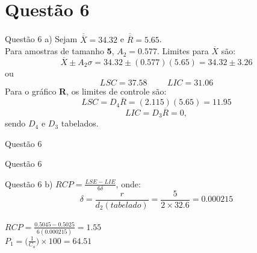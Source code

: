 \documentclass[fleqn]{beamer}\usepackage[]{graphicx}\usepackage[]{color}
\begin{document}
	\section{Questão 6}
		\begin{frame}{Questão 6}
			a)  Sejam $\overline{\overline X} = 34.32$ e $\overline{\overline R} = 5.65$.\\
			Para amostras de tamanho \textbf{5}, $A_{2} = 0.577$.
			Limites para $\overline{X}$ são:
			$$\overline{X} \pm A_{2}\sigma = 34.32 \pm (0.577)(5.65) = 34.32 \pm 3.26$$
			ou
			$$LSC = 37.58\hspace{1cm}LIC = 31.06$$
			Para o gráfico \textbf{R}, os limites de controle são:
			$$LSC = D_{4}\overline{R} = (2.115)(5.65) = 11.95$$
			$$LIC = D_{3}\overline{R} = 0,$$
			sendo $D_{4}$ e $D_{3}$ tabelados.
		\end{frame}
		\begin{frame}{Questão 6}
			\centering
		\end{frame}
		\begin{frame}{Questão 6}
			\centering
		\end{frame}
		\begin{frame}{Questão 6}
			b)  $RCP = \frac{LSE - LIE}{6\delta}$, onde:$$\delta = \frac{r}{d_{2}(tabelado)} = \frac{5}{2\times32.6} = 0.000215$$\\
			$RCP = \frac{0.5045 - 0.5025}{6(0.000215)} = 1.55$\\
			
			$P_{1} = \big(\frac{1}{C_{o}}\big)\times100 = 64.51$
		\end{frame}
\end{document}
